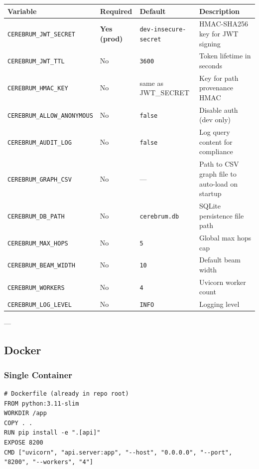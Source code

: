 \documentclass[11pt,article,oneside]{memoir}
\begin{document}
\begin{center}
{\footnotesize
\begin{tabularx}{\columnwidth}{|>{\raggedright\arraybackslash}X|>{\raggedright\arraybackslash}X|>{\raggedright\arraybackslash}X|>{\raggedright\arraybackslash}X|}
\hline
Variable & Required & Default & Description \\ \hline
\texttt{CEREBRUM\_JWT\_SECRET} & \textbf{Yes (prod)} & \texttt{dev-insecure-secret} & HMAC-SHA256 key for JWT signing \\ \hline
\texttt{CEREBRUM\_JWT\_TTL} & No & \texttt{3600} & Token lifetime in seconds \\ \hline
\texttt{CEREBRUM\_HMAC\_KEY} & No & same as JWT\_SECRET & Key for path provenance HMAC \\ \hline
\texttt{CEREBRUM\_ALLOW\_ANONYMOUS} & No & \texttt{false} & Disable auth (dev only) \\ \hline
\texttt{CEREBRUM\_AUDIT\_LOG} & No & \texttt{false} & Log query content for compliance \\ \hline
\texttt{CEREBRUM\_GRAPH\_CSV} & No & — & Path to CSV graph file to auto-load on startup \\ \hline
\texttt{CEREBRUM\_DB\_PATH} & No & \texttt{cerebrum.db} & SQLite persistence file path \\ \hline
\texttt{CEREBRUM\_MAX\_HOPS} & No & \texttt{5} & Global max hops cap \\ \hline
\texttt{CEREBRUM\_BEAM\_WIDTH} & No & \texttt{10} & Default beam width \\ \hline
\texttt{CEREBRUM\_WORKERS} & No & \texttt{4} & Uvicorn worker count \\ \hline
\texttt{CEREBRUM\_LOG\_LEVEL} & No & \texttt{INFO} & Logging level \\ \hline
\end{tabularx}
}
\end{center}

---

\subsection{Docker}

\subsubsection{Single Container}

\begin{lstlisting}
# Dockerfile (already in repo root)
FROM python:3.11-slim
WORKDIR /app
COPY . .
RUN pip install -e ".[api]"
EXPOSE 8200
CMD ["uvicorn", "api.server:app", "--host", "0.0.0.0", "--port", "8200", "--workers", "4"]
\end{lstlisting}
\end{document}
